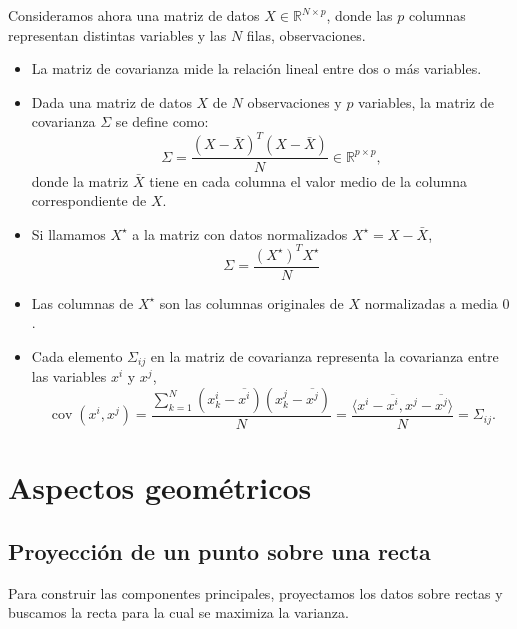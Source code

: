 \documentclass[a4paper]{article}
\DeclareMathOperator{\cov}{cov}
\newcommand{\R}{{\mathbb R}}
\begin{document}
Consideramos ahora una matriz de datos $X \in \R^{N \times p}$, donde las $p$ columnas representan distintas variables y las $N$ filas, observaciones.
\begin{itemize}
    \item La matriz de covarianza mide la relación lineal entre dos o más variables.
    \item Dada una matriz de datos \( X \) de \( N \) observaciones y \( p \) variables, la matriz de covarianza \( \Sigma \) se define como:
    \[
    \Sigma = \frac{(X - \bar X)^T (X - \bar X)}{N} \in \R^{p \times p},
    \]
    donde la matriz $\bar X$ tiene en cada columna el valor medio de la columna correspondiente de $X$.
    \item Si llamamos $X^\star$ a la matriz con datos normalizados $X^\star = X - \bar X$,
    $$\boxed{\Sigma = \frac{(X^\star)^T X^\star}{N}}$$

    \item Las columnas de $X^\star$ son las columnas originales de $X$ normalizadas a media $0$.
    \item Cada elemento $\Sigma_{ij}$ en la matriz de covarianza representa la covarianza entre las variables $x^i$ y $x^j$,
    $$\cov(x^i, x^j) = \frac{\sum_{k = 1}^N (x_k^i - \overline{x^i})(x_k^j - \overline{x^j})}{N}  = \frac{\langle x^i - \overline{x^i}, x^j - \overline{x^j} \rangle}{N} = {\Sigma}_{ij}.$$
\end{itemize}

\section{Aspectos geométricos}

\subsection{Proyección de un punto sobre una recta}

Para construir las componentes principales, proyectamos los datos sobre rectas y buscamos la recta para la cual se maximiza la varianza.
\end{document}
